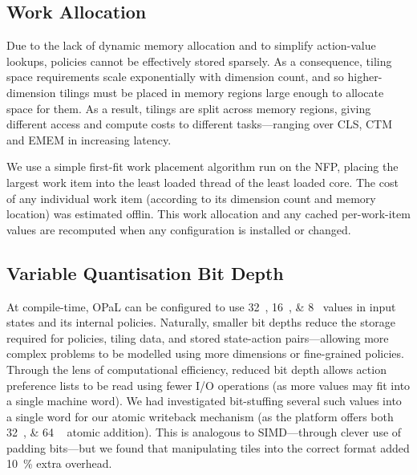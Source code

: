 \documentclass[sigconf,natbib=false]{acmart}
\newcommand{\approachshort}{OPaL}
\begin{document}
\subsection{Work Allocation}
Due to the lack of dynamic memory allocation and to simplify action-value lookups, policies cannot be effectively stored sparsely.
As a consequence, tiling space requirements scale exponentially with dimension count, and so higher-dimension tilings must be placed in memory regions large enough to allocate space for them.
As a result, tilings are split across memory regions, giving different access and compute costs to different tasks---ranging over CLS, CTM and EMEM in increasing latency.

We use a simple first-fit work placement algorithm run on the NFP, placing the largest work item into the least loaded thread of the least loaded core.
The cost of any individual work item (according to its dimension count and memory location) was estimated offlin.
This work allocation and any cached per-work-item values are recomputed when any configuration is installed or changed.

\subsection{Variable Quantisation Bit Depth}
At compile-time, \approachshort{} can be configured to use \SIlist[list-final-separator = { \translate{or} }]{32;16;8}{\bit} values in input states and its internal policies.
Naturally, smaller bit depths reduce the storage required for policies, tiling data, and stored state-action pairs---allowing more complex problems to be modelled using more dimensions or fine-grained policies.
Through the lens of computational efficiency, reduced bit depth allows action preference lists to be read using fewer I/O operations (as more values may fit into a single machine word).
We had investigated bit-stuffing several such values into a single word for our atomic writeback mechanism (as the platform offers both \SIlist{32;64
}{\bit} atomic addition).
This is analogous to SIMD---through clever use of padding bits---but we found that manipulating tiles into the correct format added \SI{10}{\percent} extra overhead.

%
%
%
\end{document}
